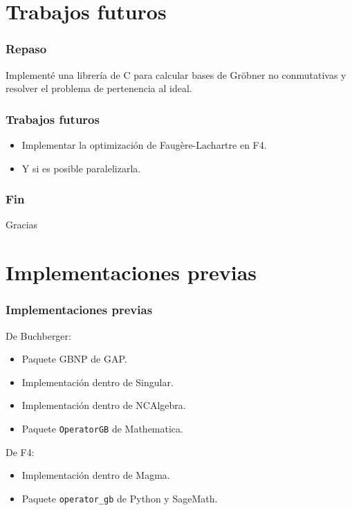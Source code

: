 \documentclass[spanish, aspectratio=169, hidecontrols]{beamer}
\newcommand\cpp{C\nolinebreak[4]\hspace{-.05em}\raisebox{.4ex}{\relsize{-3}{\textbf{++}}}\xspace}
\begin{document}
\section{Trabajos futuros}

\begin{frame}
  \frametitle{Repaso}
  Implementé una librería de \cpp para calcular bases de Gröbner no conmutativas y resolver el problema de pertenencia al ideal.
\end{frame}

\begin{frame}
  \frametitle{Trabajos futuros}
  \begin{itemize}
    \item Implementar la optimización de Faugère-Lachartre en F4.
    \item Y si es posible paralelizarla.
  \end{itemize}
\end{frame}

\appendix

\begin{frame}
  \frametitle{Fin}
  \begin{center}
    \Huge Gracias
  \end{center}
\end{frame}

\appendix

\section{Implementaciones previas}

\begin{frame}
  \frametitle{Implementaciones previas}
  \pause
  De Buchberger:
  \begin{itemize}
    \item Paquete GBNP de GAP.
    \item Implementación dentro de Singular.
    \item Implementación dentro de NCAlgebra.
    \item Paquete \texttt{OperatorGB} de Mathematica.
  \end{itemize}
  \pause
  De F4:
  \begin{itemize}
    \item Implementación dentro de Magma.
    \item Paquete \texttt{operator\_gb} de Python y SageMath.
  \end{itemize}
\end{frame}
\end{document}
